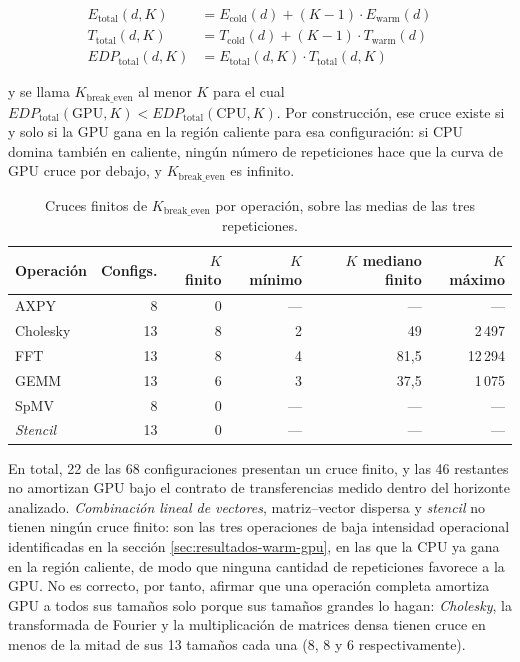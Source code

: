 \documentclass[12pt,oneside,spanish]{book}
\begin{document}
\begin{align*}
E_{\text{total}}(d, K) &= E_{\text{cold}}(d) + (K - 1) \cdot E_{\text{warm}}(d) \\
T_{\text{total}}(d, K) &= T_{\text{cold}}(d) + (K - 1) \cdot T_{\text{warm}}(d) \\
EDP_{\text{total}}(d, K) &= E_{\text{total}}(d, K) \cdot T_{\text{total}}(d, K)
\end{align*}

y se llama $K_{\text{break\_even}}$ al menor $K$ para el cual $EDP_{\text{total}}(\text{GPU}, K) < EDP_{\text{total}}(\text{CPU}, K)$. Por construcción, ese cruce existe si y solo si la GPU gana en la región caliente para esa configuración: si CPU domina también en caliente, ningún número de repeticiones hace que la curva de GPU cruce por debajo, y $K_{\text{break\_even}}$ es infinito.

\begin{table}[H]
\centering
\caption[Mapa de amortización $K_{\text{break\_even}}$ por operación]{Cruces finitos de $K_{\text{break\_even}}$ por operación, sobre las medias de las tres repeticiones.}
\label{tab:r1-amortizacion}
\begin{tabular}{lrrrrr}
\toprule
\textbf{Operación} & \textbf{Configs.} & \textbf{$K$ finito} & \textbf{$K$ mínimo} & \textbf{$K$ mediano finito} & \textbf{$K$ máximo} \\
\midrule
AXPY      & 8  & 0 & --- & --- & --- \\
Cholesky  & 13 & 8 & 2   & 49    & 2\,497  \\
FFT       & 13 & 8 & 4   & 81,5  & 12\,294 \\
GEMM      & 13 & 6 & 3   & 37,5  & 1\,075  \\
SpMV      & 8  & 0 & --- & --- & --- \\
\textit{Stencil} & 13 & 0 & --- & --- & --- \\
\bottomrule
\end{tabular}
\end{table}

En total, 22 de las 68 configuraciones presentan un cruce finito, y las 46 restantes no amortizan GPU bajo el contrato de transferencias medido dentro del horizonte analizado. \textit{Combinación lineal de vectores}, matriz--vector dispersa y \textit{stencil} no tienen ningún cruce finito: son las tres operaciones de baja intensidad operacional identificadas en la sección \ref{sec:resultados-warm-gpu}, en las que la CPU ya gana en la región caliente, de modo que ninguna cantidad de repeticiones favorece a la GPU. No es correcto, por tanto, afirmar que una operación completa amortiza GPU a todos sus tamaños solo porque sus tamaños grandes lo hagan: \textit{Cholesky}, la transformada de Fourier y la multiplicación de matrices densa tienen cruce en menos de la mitad de sus 13 tamaños cada una (8, 8 y 6 respectivamente).
\end{document}
